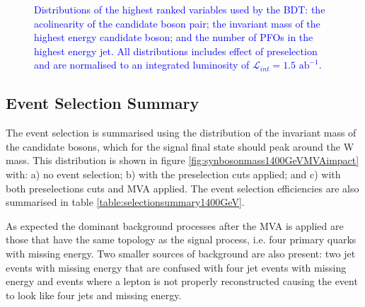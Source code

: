 \begin{figure}[h!]
\caption[Distributions of the highest ranked variables used by the BDT: \protect{} the acolinearity of the candidate boson pair; \protect{} the invariant mass of the highest energy candidate boson; and \protect{} the number of PFOs in the highest energy jet.  All distributions includes effect of preselection and are normalised to an integrated luminosity of $\mathcal{L}_{int} = 1.5\text{ ab}^{-1}$.]{\textcolor{blue}{Distributions of the highest ranked variables used by the BDT: \protect{} the acolinearity of the candidate boson pair; \protect{} the invariant mass of the highest energy candidate boson; and \protect{} the number of PFOs in the highest energy jet.  All distributions includes effect of preselection and are normalised to an integrated luminosity of $\mathcal{L}_{int} = 1.5\text{ ab}^{-1}$.}}
\label{fig:rankingvariables}
\end{figure}


\subsection{Event Selection Summary}
\label{sec:eventselsummary1400GeV}
The event selection is summarised using the distribution of the invariant mass of the candidate bosons, which for the signal final state should peak around the W mass.  This distribution is shown in figure \ref{fig:synbosonmass1400GeVMVAimpact} with: a) no event selection; b) with the preselection cuts applied; and c) with both preselections cuts and MVA applied.  The event selection efficiencies are also summarised in table \ref{table:selectionsummary1400GeV}.

As expected the dominant background processes after the MVA is applied are those that have the same topology as the signal process, i.e. four primary quarks with missing energy.  Two smaller sources of background are also present: two jet events with missing energy that are confused with four jet events with missing energy and events where a lepton is not properly reconstructed causing the event to look like four jets and missing energy.  

